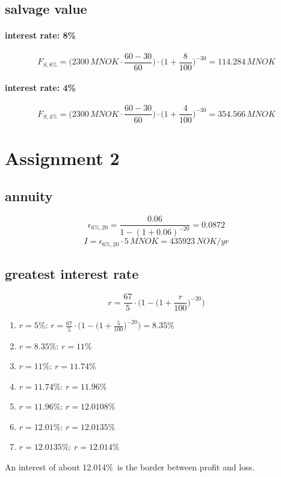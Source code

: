 \documentclass{article}
\begin{document}
\subsection{salvage value}
\paragraph{interest rate: 8\%\\}
$$F_{S,8\%}=\bigg(2300\,MNOK\cdot\frac{60-30}{60}\bigg)\cdot\bigg(1+\frac{8}{100}\bigg)^{-30}=114.284\,MNOK$$
\paragraph{interest rate: 4\%\\}
$$F_{S,4\%}=\bigg(2300\,MNOK\cdot\frac{60-30}{60}\bigg)\cdot\bigg(1+\frac{4}{100}\bigg)^{-30}=354.566\,MNOK$$
\section{Assignment 2}
\subsection{annuity}
$$\epsilon_{6\%,20}=\frac{0.06}{1-(1+0.06)^{-20}}=0.0872$$
$$I=\epsilon_{6\%,20}\cdot 5\,MNOK=435923\,NOK/yr$$
\subsection{greatest interest rate}
$$r=\frac{67}{5}\cdot\bigg(1-\big(1+\frac{r}{100}\big)^{-20}\bigg)$$
\begin{enumerate}
\item $r=5\%$: $r=\frac{67}{5}\cdot\bigg(1-\big(1+\frac{5}{100}\big)^{-20}\bigg)=8.35\%$
\item $r=8.35\%$: $r=11\%$
\item $r=11\%$: $r=11.74\%$
\item $r=11.74\%$: $r=11.96\%$
\item $r=11.96\%$: $r=12.0108\%$
\item $r=12.01\%$: $r=12.0135\%$
\item $r=12.0135\%$: $r=12.014\%$
\end{enumerate}
An interest of about 12.014\%\, is the border between profit and loss.
\end{document}
